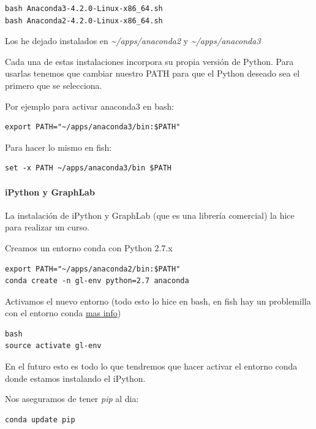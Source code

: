 \documentclass[12pt,spanish,]{scrartcl}
\let\oldparagraph\paragraph
\renewcommand{\paragraph}[1]{\oldparagraph{#1}\mbox{}}
\begin{document}
\begin{verbatim}
bash Anaconda3-4.2.0-Linux-x86_64.sh
bash Anaconda2-4.2.0-Linux-x86_64.sh
\end{verbatim}

Los he dejado instalados en \emph{\textasciitilde{}/apps/anaconda2} y
\emph{\textasciitilde{}/apps/anaconda3}

Cada una de estas instalaciones incorpora su propia versión de Python.
Para usarlas tenemos que cambiar nuestro PATH para que el Python deseado
sea el primero que se selecciona.

Por ejemplo para activar anaconda3 en bash:

\begin{verbatim}
export PATH="~/apps/anaconda3/bin:$PATH"
\end{verbatim}

Para hacer lo mismo en fish:

\begin{verbatim}
set -x PATH ~/apps/anaconda3/bin $PATH
\end{verbatim}

\paragraph{iPython y GraphLab}\label{ipython-y-graphlab}

La instalación de iPython y GraphLab (que es una librería comercial) la
hice para realizar un curso.

Creamos un entorno conda con Python 2.7.x

\begin{verbatim}
export PATH="~/apps/anaconda2/bin:$PATH"
conda create -n gl-env python=2.7 anaconda
\end{verbatim}

Activamos el nuevo entorno (todo esto lo hice en bash, en fish hay un
problemilla con el entorno conda
\href{https://penandpants.com/2014/02/28/using-conda-environments-and-the-fish-shell/}{mas
info})

\begin{verbatim}
bash
source activate gl-env
\end{verbatim}

En el futuro esto es todo lo que tendremos que hacer activar el entorno
conda donde estamos instalando el iPython.

Nos aseguramos de tener \emph{pip} al dia:

\begin{verbatim}
conda update pip
\end{verbatim}
\end{document}

